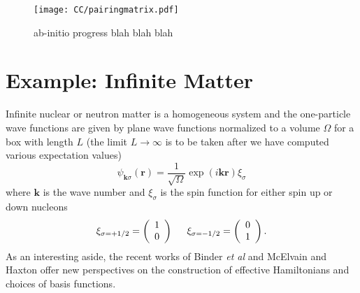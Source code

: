 \documentclass[thesis.tex]{subfiles}
\begin{document}
\begin{figure}
  \centering
  \texttt{[image: CC/pairingmatrix.pdf]}
  \caption{ab-initio progress blah blah blah}
  \label{fig:pairingmatrix}
\end{figure}


\section{Example: Infinite Matter} \label{section:infinitematter}

Infinite nuclear or neutron matter is a homogeneous system and the one-particle wave functions are given by plane wave functions normalized to a volume $\Omega$ for a box with length $L$ (the limit $L\rightarrow \infty$ is to be taken after we have computed various expectation values)
\[
\psi_{\mathbf{k}\sigma}(\mathbf{r})=
\frac{1}{\sqrt{\Omega}}\exp{(i\mathbf{kr})}\xi_{\sigma}
\]
where $\mathbf{k}$ is the wave number and $\xi_{\sigma}$ is the spin
function for either spin up or down nucleons
\[ 
\xi_{\sigma=+1/2}=\left(\begin{array}{c} 1
  \\ 0 \end{array}\right) \hspace{0.5cm}
\xi_{\sigma=-1/2}=\left(\begin{array}{c} 0 \\ 1 \end{array}\right).
\]
As an interesting aside, the recent works of Binder {\em et al} \cite{binder2016} and McElvain and Haxton
\cite{haxton2016} offer new perspectives on the construction of effective Hamiltonians and choices of basis functions.
\end{document}
